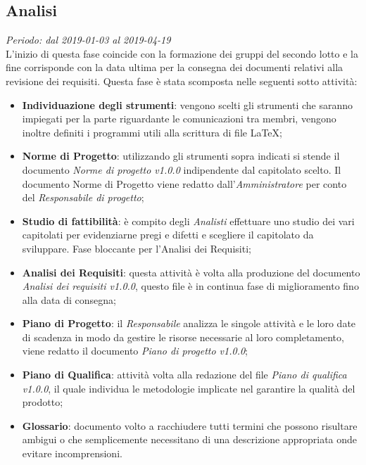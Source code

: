 \subsection{Analisi}
\textit{Periodo: dal 2019-01-03 al 2019-04-19}\\
L'inizio di questa fase coincide con la formazione dei gruppi del secondo lotto e la fine corrisponde con la data ultima per la consegna dei documenti relativi alla revisione dei requisiti.
Questa fase è stata scomposta nelle seguenti sotto attività:
\begin{itemize}
	\item \textbf{Individuazione degli strumenti}: vengono scelti gli strumenti che saranno impiegati per la parte riguardante le comunicazioni tra membri, vengono inoltre definiti i programmi utili alla scrittura di file \LaTeX; 
	\item \textbf{Norme di Progetto}: utilizzando gli strumenti sopra indicati si stende il documento \textit{Norme di progetto v1.0.0} indipendente dal capitolato scelto. Il documento Norme di Progetto viene redatto dall'\textit{Amministratore} per conto del \textit{Responsabile di progetto};
	\item \textbf{Studio di fattibilità}: è compito degli \textit{Analisti} effettuare uno studio dei vari capitolati per evidenziarne pregi e difetti e scegliere il capitolato da sviluppare. Fase bloccante per l'Analisi dei Requisiti;
	\item \textbf{Analisi dei Requisiti}: questa attività è volta alla produzione del documento \textit{Analisi dei requisiti v1.0.0}, questo file è in continua fase di miglioramento fino alla data di consegna;
	\item \textbf{Piano di Progetto}: il \textit{Responsabile} analizza le singole attività e le loro date di scadenza in modo da gestire le risorse necessarie al loro completamento, viene redatto il documento \textit{Piano di progetto v1.0.0};
	\item \textbf{Piano di Qualifica}: attività volta alla redazione del file \textit{Piano di qualifica v1.0.0}, il quale individua le metodologie implicate nel garantire la qualità del prodotto; 
	\item \textbf{Glossario}: documento volto a racchiudere tutti termini che possono risultare ambigui o che semplicemente necessitano di una descrizione appropriata onde evitare incomprensioni.
\end{itemize}

